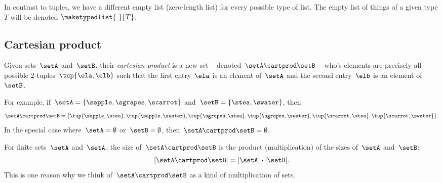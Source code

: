 In contrast to tuples, we have a different empty list (zero-length list) for every possible type of list.
The empty list of things of a given type $T$ will be denoted $\maketypedlist{\ }{T}$.

\subsection{Cartesian product}
\label{sec:cartesian-product}

Given sets~$\setA$ and~$\setB$, their \emph{cartesian product} is a new set -- denoted~$\setA \cartprod \setB$ -- who's elements are precisely all possible 2-tuples~$\tup{\ela, \elb}$ such that the first entry~$\ela$ is an element of~$\setA$ and the second entry~$\elb$ is an element of~$\setB$.

For example, if~$\setA = \{ \sapple, \sgrapes, \scarrot\}$ and~$\setB = \{ \stea, \swater \}$, then
\begin{equation*}
    \setA \cartprod \setB = \{ \tup{\sapple, \stea}, \tup{\sapple, \swater}, \tup{\sgrapes, \stea}, \tup{\sgrapes, \swater},  \tup{\scarrot, \stea}, \tup{\scarrot, \swater}\}.
\end{equation*}
In the special case where~$\setA = \emptyset$ or~$\setB = \emptyset$, then~$\setA \cartprod \setB = \emptyset$.

%

\begin{remark}
    For finite sets~$\setA$ and~$\setA$, the size of~$\setA \cartprod \setB$ is the product (multiplication) of the sizes of~$\setA$ and~$\setB$:
    \begin{equation*}
        \vert \setA \cartprod \setB \vert = \vert \setA \vert \cdot \vert \setB \vert.
    \end{equation*}
    This is one reason why we think of~$\setA \cartprod \setB$ as a kind of multiplication of sets.
\end{remark}

